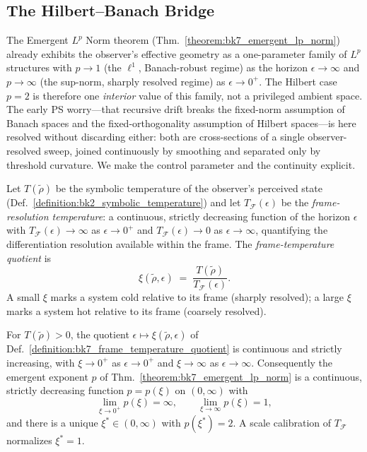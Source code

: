 \subsection{The Hilbert--Banach Bridge}
\label{subsec:bk7_hilbert_banach_bridge}
The Emergent $L^{p}$ Norm theorem (Thm.~\ref{theorem:bk7_emergent_lp_norm})
already exhibits the observer's effective geometry as a one-parameter family of
$L^{p}$ structures with $p\to 1$ (the $\ell^{1}$, Banach-robust regime) as the
horizon $\epsilon\to\infty$ and $p\to\infty$ (the sup-norm, sharply resolved
regime) as $\epsilon\to 0^{+}$. The Hilbert case $p=2$ is therefore one
\emph{interior} value of this family, not a privileged ambient space. The early
PS worry---that recursive drift breaks the fixed-norm assumption of Banach
spaces and the fixed-orthogonality assumption of Hilbert spaces---is here
resolved without discarding either: both are cross-sections of a single
observer-resolved sweep, joined continuously by smoothing and separated only by
threshold curvature. We make the control parameter and the continuity explicit.

\begin{definition}
\label{definition:bk7_frame_temperature_quotient}
Let $T(\tilde\rho)$ be the symbolic temperature of the observer's perceived state
(Def.~\ref{definition:bk2_symbolic_temperature}) and let $T_{\mathcal{F}}(\epsilon)$
be the \emph{frame-resolution temperature}: a continuous, strictly decreasing
function of the horizon $\epsilon$ with $T_{\mathcal{F}}(\epsilon)\to\infty$ as
$\epsilon\to 0^{+}$ and $T_{\mathcal{F}}(\epsilon)\to 0$ as $\epsilon\to\infty$,
quantifying the differentiation resolution available within the frame. The
\emph{frame-temperature quotient} is
\[
\xi(\tilde\rho,\epsilon)\;=\;\frac{T(\tilde\rho)}{T_{\mathcal{F}}(\epsilon)}.
\]
A small $\xi$ marks a system cold relative to its frame (sharply resolved); a
large $\xi$ marks a system hot relative to its frame (coarsely resolved).
\end{definition}

\begin{lemma}
\label{lemma:bk7_frame_temperature_exponent_correspondence}
For $T(\tilde\rho)>0$, the quotient $\epsilon\mapsto\xi(\tilde\rho,\epsilon)$ of
Def.~\ref{definition:bk7_frame_temperature_quotient} is continuous and strictly
increasing, with $\xi\to 0^{+}$ as $\epsilon\to 0^{+}$ and $\xi\to\infty$ as
$\epsilon\to\infty$. Consequently the emergent exponent
$p$ of Thm.~\ref{theorem:bk7_emergent_lp_norm} is a continuous, strictly
decreasing function $p=p(\xi)$ on $(0,\infty)$ with
\[
\lim_{\xi\to 0^{+}}p(\xi)=\infty,
\qquad
\lim_{\xi\to\infty}p(\xi)=1,
\]
and there is a unique $\xi^{\ast}\in(0,\infty)$ with $p(\xi^{\ast})=2$. A scale
calibration of $T_{\mathcal{F}}$ normalizes $\xi^{\ast}=1$.
\end{lemma}


